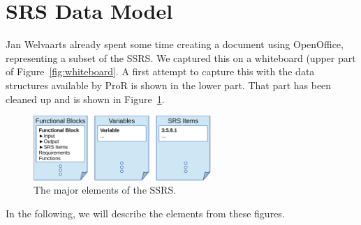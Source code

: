 \documentclass{template/openetcs_article}
\begin{document}
\tableofcontents
\listoffiguresandtables
\newpage





\section{SRS Data Model}

Jan Welvaarts already spent some time creating a document using OpenOffice, representing a subset of the SSRS.  We captured this on a whiteboard (upper part of Figure~\ref{fig:whiteboard}.  A first attempt to capture this with the data structures available by ProR is shown in the lower part.  That part has been cleaned up and is shown in Figure~\ref{fig:ssrs_elements}.

\begin{figure}
	\begin{center}
	\includegraphics[width=0.6\textwidth]{img/relationships.pdf}
	\end{center}
	\caption{The major elements of the SSRS.}
	\label{fig:ssrs_elements}
\end{figure}

In the following, we will describe the elements from these figures.
\end{document}
